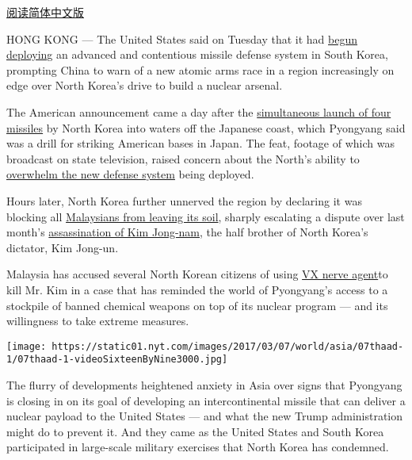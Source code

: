 \href{http://cn.nytimes.com/china/20170308/thaad-missile-defense-us-south-korea-china/}{阅读简体中文版}

HONG KONG --- The United States said on Tuesday that it had
\href{https://www.nytimes.com/2017/03/06/world/asia/north-korea-thaad-missile-defense-us-china.html}{begun
deploying} an advanced and contentious missile defense system in South
Korea, prompting China to warn of a new atomic arms race in a region
increasingly on edge over North Korea's drive to build a nuclear
arsenal.

The American announcement came a day after the
\href{https://www.nytimes.com/2017/03/05/world/north-korea-ballistic-missiles.html}{simultaneous
launch of four missiles} by North Korea into waters off the Japanese
coast, which Pyongyang said was a drill for striking American bases in
Japan. The feat, footage of which was broadcast on state television,
raised concern about the North's ability to
\href{https://www.nytimes.com/2017/03/06/world/asia/north-korea-missiles-japan.html}{overwhelm
the new defense system} being deployed.

Hours later, North Korea further unnerved the region by declaring it was
blocking all
\href{https://www.nytimes.com/2017/03/07/world/asia/kim-jong-nam-north-korea-malaysia-travel-ban.html?hp\&action=click\&pgtype=Homepage\&clickSource=story-heading\&module=first-column-region\&region=top-news\&WT.nav=top-news\&_r=0}{Malaysians
from leaving its soil}, sharply escalating a dispute over last month's
\href{https://www.nytimes.com/2017/02/22/world/asia/kim-jong-nam-assassination-korea-malaysia.html}{assassination
of Kim Jong-nam}, the half brother of North Korea's dictator, Kim
Jong-un.

Malaysia has accused several North Korean citizens of using
\href{https://www.nytimes.com/2017/02/24/world/asia/vx-nerve-agent-kim-jong-nam.html}{VX
nerve agent}to kill Mr. Kim in a case that has reminded the world of
Pyongyang's access to a stockpile of banned chemical weapons on top of
its nuclear program --- and its willingness to take extreme measures.

\texttt{[image: https://static01.nyt.com/images/2017/03/07/world/asia/07thaad-1/07thaad-1-videoSixteenByNine3000.jpg]}

The flurry of developments heightened anxiety in Asia over signs that
Pyongyang is closing in on its goal of developing an intercontinental
missile that can deliver a nuclear payload to the United States --- and
what the new Trump administration might do to prevent it. And they came
as the United States and South Korea participated in large-scale
military exercises that North Korea has condemned.

